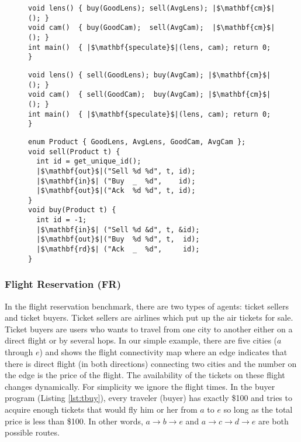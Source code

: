 \begin{figure}[th]
\begin{lstlisting}[label=lst:bob,caption=Bob's Agent]
void lens() { buy(GoodLens); sell(AvgLens); |$\mathbf{cm}$|(); }
void cam()  { buy(GoodCam);  sell(AvgCam);  |$\mathbf{cm}$|(); }
int main()  { |$\mathbf{speculate}$|(lens, cam); return 0; }
\end{lstlisting}

\begin{lstlisting}[label=lst:jill,caption=Jill's Agent]
void lens() { sell(GoodLens); buy(AvgCam); |$\mathbf{cm}$|(); }
void cam()  { sell(GoodCam);  buy(AvgCam); |$\mathbf{cm}$|(); }
int main()  { |$\mathbf{speculate}$|(lens, cam); return 0; }
\end{lstlisting}

\begin{lstlisting}[label=lst:bjcom,caption=Common Routines for Trading]
enum Product { GoodLens, AvgLens, GoodCam, AvgCam };
void sell(Product t) {
  int id = get_unique_id();
  |$\mathbf{out}$|("Sell %d %d", t, id);
  |$\mathbf{in}$| ("Buy  _  %d",    id);
  |$\mathbf{out}$|("Ack  %d %d", t, id);
}
void buy(Product t) {
  int id = -1;
  |$\mathbf{in}$| ("Sell %d &d", t, &id);
  |$\mathbf{out}$|("Buy  %d %d", t,  id);
  |$\mathbf{rd}$| ("Ack  _  %d",     id);
}
\end{lstlisting}
\end{figure}

\subsubsection*{Flight Reservation (FR)}

In the flight reservation benchmark, there are two types of agents:
ticket sellers and ticket buyers. Ticket sellers are 
airlines which put up the air tickets for sale. Ticket buyers
are users who wants to travel from one city to another either on a direct
flight or by several hops. 
In our simple example, there are five cities ($a$ through $e$) 
and  shows the flight connectivity map where 
an edge indicates that there is direct flight (in both directions) 
connecting two cities and the number on the edge is the price of the
flight. The availability of the tickets on these flight changes dynamically.
For simplicity we ignore the flight times.  
In the buyer program (Listing \ref{lst:tbuy}), 
every traveler (buyer) has exactly \$100 and tries to acquire enough tickets
that would fly him or her from $a$ to $e$ so long as the total price is 
less than \$100. In other words, $a \to b \to e$ 
and $a \to c \to d \to e$ are both possible routes.

